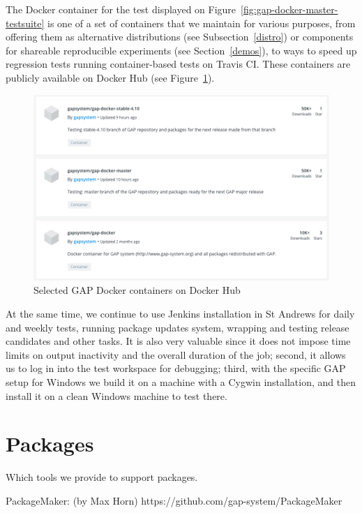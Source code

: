\documentclass{deliverablereport}
\begin{document}
The Docker container for the test displayed on Figure~\ref{fig:gap-docker-master-testsuite}
is one of a set of containers that we maintain for various purposes, from offering 
them as alternative distributions (see Subsection~\ref{distro}) or components for shareable
reproducible experiments (see Section~\ref{demos}), to ways to speed up regression tests running
container-based tests on Travis CI. These containers are publicly available on Docker Hub
(see Figure~\ref{fig:gap-docker}).

\begin{figure}[!ht]
    \centering
    \includegraphics[width=12cm]{images/gap-docker}
    \caption{Selected GAP Docker containers on Docker Hub}
    \label{fig:gap-docker}
\end{figure}

At the same time, we continue to use Jenkins installation in St Andrews 
for daily and weekly tests, running package updates system, wrapping and
testing release candidates and other tasks. It is also very valuable since 
it does not impose time limits on output inactivity and the overall duration
of the job; second, it allows us to log in into the test workspace for
debugging; third, with the specific GAP setup for Windows we build it on a
machine with a Cygwin installation, and then install it on a clean Windows
machine to test there. 

\section{\GAP Packages}\label{packages}

Which tools we provide to support packages.

PackageMaker: (by Max Horn) https://github.com/gap-system/PackageMaker 
\end{document}

